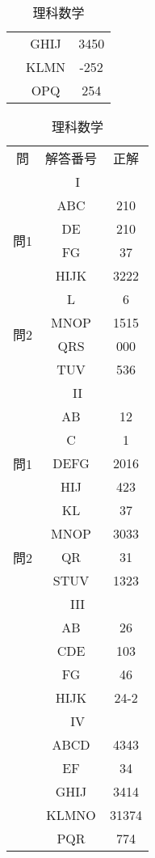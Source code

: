 \documentclass{jsarticle}
\begin{document}
\begin{CJK}{UTF8}{min}
\begin{table}[htbp]
\begin{minipage}[t]{0.48\textwidth}
\begin{tabular}{|c|c|c|}
 & \textsf{GHIJ} & 3450 \\
 & \textsf{KLMN} & -252 \\
 & \textsf{OPQ} & 254 \\
\hline
\end{tabular}
\end{minipage}
\hfill
\begin{minipage}[t]{0.48\textwidth}
\centering
\caption*{理科数学}
\begin{tabular}{|c|c|c|}
\hline
\multirow{2}{*}{問} & \multirow{2}{*}{解答番号} & \multirow{2}{*}{正解} \\
 &  & \\
\hline
\multicolumn{3}{|c|}{I} \\
\hline
\multirow{4}{*}{問1} 
 & \textsf{ABC} & 210 \\
 & \textsf{DE} & 210 \\
 & \textsf{FG} & 37 \\
 & \textsf{HIJK} & 3222 \\
\hline
\multirow{4}{*}{問2} 
 & \textsf{L} & 6 \\
 & \textsf{MNOP} & 1515 \\
 & \textsf{QRS} & 000 \\
 & \textsf{TUV} & 536 \\
\hline
\multicolumn{3}{|c|}{II} \\
\hline
\multirow{5}{*}{問1} 
 & \textsf{AB} & 12 \\
 & \textsf{C} & 1 \\
 & \textsf{DEFG} & 2016 \\
 & \textsf{HIJ} & 423 \\
 & \textsf{KL} & 37 \\
\hline
\multirow{3}{*}{問2} 
 & \textsf{MNOP} & 3033 \\
 & \textsf{QR} & 31 \\
 & \textsf{STUV} & 1323 \\
\hline
\multicolumn{3}{|c|}{III} \\
\hline
 & \textsf{AB} & 26 \\
 & \textsf{CDE} & 103 \\
 & \textsf{FG} & 46\\
 & \textsf{HIJK} & 24-2 \\
\hline
\multicolumn{3}{|c|}{IV} \\
\hline
 & \textsf{ABCD} & 4343 \\
 & \textsf{EF} & 34 \\
 & \textsf{GHIJ} & 3414 \\
 & \textsf{KLMNO} & 31374 \\
 & \textsf{PQR} & 774 \\
\hline
\end{tabular}
\end{minipage}
\end{table}

\end{CJK}
\end{document}
